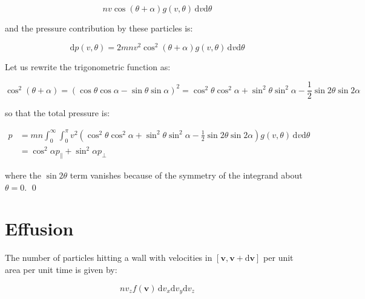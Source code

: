\documentclass[12pt]{article}
\begin{document}
\begin{equation}
    nv \cos{(\theta + \alpha)} g(v, \theta) \, \mathrm{d}v \mathrm{d}\theta
\end{equation}

and the pressure contribution by these particles is:

\begin{equation}
    \mathrm{d}p(v, \theta) = 2mnv^{2} \cos^{2}{(\theta + \alpha)} g(v, \theta) \, \mathrm{d}v \mathrm{d}\theta
\end{equation}

Let us rewrite the trigonometric function as:

\begin{equation}
    \cos^{2}{(\theta + \alpha)} = \left( \cos{\theta} \cos{\alpha} - \sin{\theta} \sin{\alpha} \right)^{2} = \cos^{2}{\theta} \cos^{2}{\alpha} + \sin^{2}{\theta} \sin^{2}{\alpha} - \frac{1}{2} \sin{2\theta} \sin{2\alpha}
\end{equation}

so that the total pressure is:

\begin{equation}
    \begin{split}
        p &= mn \int_{0}^{\infty} \int_{0}^{\pi} v^{2} \left( \cos^{2}{\theta} \cos^{2}{\alpha} + \sin^{2}{\theta} \sin^{2}{\alpha} - \frac{1}{2} \sin{2\theta} \sin{2\alpha} \right) g(v, \theta) \, \mathrm{d}v \mathrm{d}\theta \\
        &= \cos^{2}\alpha p_{\parallel} + \sin^{2}\alpha p_{\perp}
    \end{split}
\end{equation}

where the $\sin{2\theta}$ term vanishes because of the symmetry of the integrand about $\theta = 0$.
\qed


\pagebreak
\section*{Effusion}



The number of particles hitting a wall with velocities in $[\mathbf{v}, \mathbf{v} + \mathrm{d}\mathbf{v}]$ per unit area per unit time is given by:

\begin{equation}
    nv_{z} f(\mathbf{v}) \, \mathrm{d}v_{x} \mathrm{d}v_{y} \mathrm{d}v_{z}
\end{equation}
\end{document}
